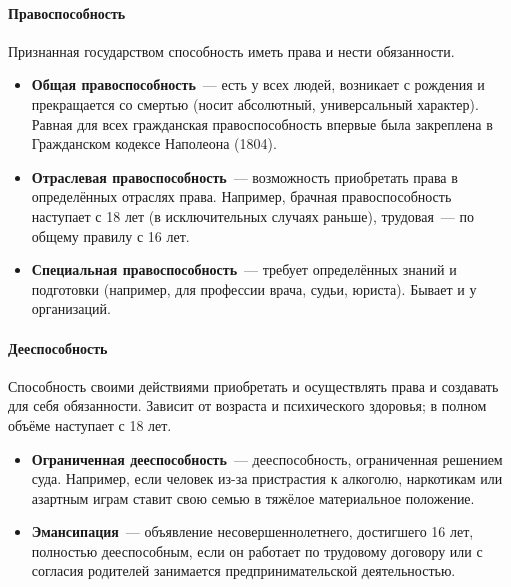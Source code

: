 \documentclass[12pt]{article}
\begin{document}
	\paragraph{Правоспособность}
	
	\begin{definition}[Правоспособность]
		Признанная государством способность иметь права и нести обязанности.
	\end{definition}
	
	\begin{itemize}
		\item \textbf{Общая правоспособность}~--- есть у всех людей, возникает с рождения и прекращается со смертью (носит абсолютный, универсальный характер). Равная для всех гражданская правоспособность впервые была закреплена в Гражданском кодексе Наполеона (1804).
		\item \textbf{Отраслевая правоспособность}~--- возможность приобретать права в определённых отраслях права. Например, брачная правоспособность наступает с 18 лет (в исключительных случаях раньше), трудовая~--- по общему правилу с 16 лет.
		\item \textbf{Специальная правоспособность}~--- требует определённых знаний и подготовки (например, для профессии врача, судьи, юриста). Бывает и у организаций.
	\end{itemize}
	
	\paragraph{Дееспособность}
	
	\begin{definition}[Дееспособность]
		Способность своими действиями приобретать и осуществлять права и создавать для себя обязанности. Зависит от возраста и психического здоровья; в полном объёме наступает с 18 лет.
	\end{definition}
	
	\begin{itemize}
		\item \textbf{Ограниченная дееспособность}~--- дееспособность, ограниченная решением суда. Например, если человек из-за пристрастия к алкоголю, наркотикам или азартным играм ставит свою семью в тяжёлое материальное положение.
		\item \textbf{Эмансипация}~--- объявление несовершеннолетнего, достигшего 16 лет, полностью дееспособным, если он работает по трудовому договору или с согласия родителей занимается предпринимательской деятельностью.
	\end{itemize}
	
\end{document}

